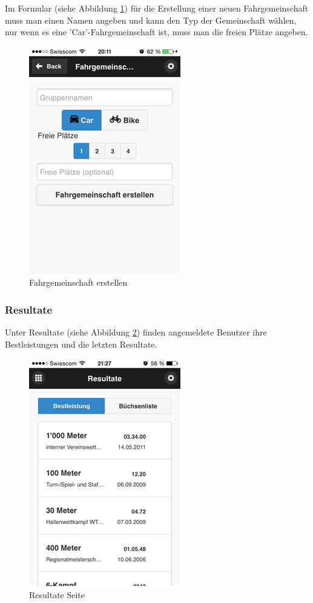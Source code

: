 Im Formular (siehe Abbildung \ref{fig:app_add_carpool}) für die Erstellung einer neuen Fahrgemeinschaft muss man einen Namen angeben und kann den Typ der Gemeinschaft wählen, nur wenn es eine 'Car'-Fahrgemeinschaft ist, muss man die freien Plätze angeben.

\begin{figure}[h]
\centering
\includegraphics[scale=0.5]{images/app/add_carpool.png}
\caption{Fahrgemeinschaft erstellen}
\label{fig:app_add_carpool}
\end{figure}


\newpage
\FloatBarrier
\subsubsection{Resultate}
Unter Resultate (siehe Abbildung \ref{fig:app_results}) finden angemeldete Benutzer ihre Bestleistungen und die letzten Resultate.
\begin{figure}[h]
\centering
\includegraphics[scale=0.5]{images/app/results.png}
\caption{Resultate Seite}
\label{fig:app_results}
\end{figure}


